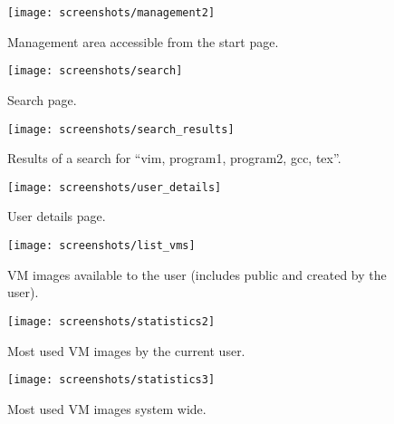 \begin{figure}[h]
  \begin{center}
    \leavevmode
    \texttt{[image: screenshots/management2]}
    \caption{Management area accessible from the start page.}
    \label{fig:management2}
  \end{center}
\end{figure}

\begin{figure}[h]
  \begin{center}
    \leavevmode
    \texttt{[image: screenshots/search]}
    \caption{Search page.}
    \label{fig:search-page}
  \end{center}
\end{figure}

\begin{figure}[h]
  \begin{center}
    \leavevmode
    \texttt{[image: screenshots/search\_results]}
    \caption{Results of a search for ``vim, program1, program2, gcc, tex''.}
    \label{fig:search-results}
  \end{center}
\end{figure}

\begin{figure}[h]
  \begin{center}
    \leavevmode
    \texttt{[image: screenshots/user\_details]}
    \caption{User details page.}
    \label{fig:1}
  \end{center}
\end{figure}

\begin{figure}[h]
  \begin{center}
    \leavevmode
    \texttt{[image: screenshots/list\_vms]}
    \caption{VM images available to the user (includes public and created by the user).}
    \label{fig:user-vms}
  \end{center}
\end{figure}

\begin{figure}[h]
  \begin{center}
    \leavevmode
    \texttt{[image: screenshots/statistics2]}
    \caption{Most used VM images by the current user.}
    \label{fig:user-mostused-vms}
  \end{center}
\end{figure}

\begin{figure}[h]
  \begin{center}
    \leavevmode
    \texttt{[image: screenshots/statistics3]}
    \caption{Most used VM images system wide.}
    \label{fig:system-mostused-vms}
  \end{center}
\end{figure}

